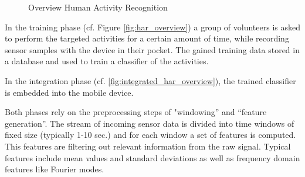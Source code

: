 \begin{figure}[htbp]
\centering
{}
\caption{Overview Human Activity Recognition}
\end{figure}


In the training phase (cf. Figure \ref{fig:har_overview}) a group of
volunteers is asked to perform the targeted activities for a certain
amount of time, while recording sensor samples with the device in
their pocket.  The gained training data stored in a database and used
to train a classifier of the activities.

In the integration phase (cf. \ref{fig:integrated_har_overview}), the
trained classifier is embedded into the mobile device.

Both phases rely on the preprocessing steps of "windowing'' and
``feature generation''. The stream of incoming sensor data is divided into
time windows of fixed size (typically 1-10 sec.) and for each window
a set of features is computed. This features are filtering out
relevant information from the raw signal. Typical features include
mean values and standard deviations as well as frequency domain
features like Fourier modes.

